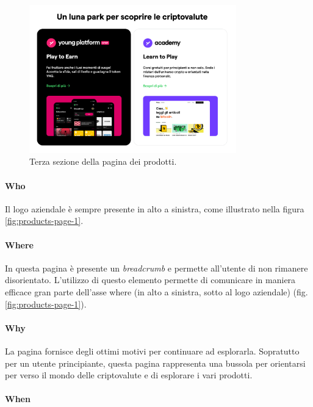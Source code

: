 \begin{figure}[H]
  \centering
  \includegraphics[width=0.80\textwidth]{res/images/internal-pages/products-page/products-page-3.png}
  \caption{Terza sezione della pagina dei prodotti.}
  \label{fig:products-page-3}
\end{figure}

\paragraph{Who}

Il logo aziendale è sempre presente in alto a sinistra, come illustrato 
nella figura \ref{fig:products-page-1}.

\paragraph{Where}

In questa pagina è presente un \textit{breadcrumb} e permette all'utente 
di non rimanere disorientato. L'utilizzo di questo elemento permette di 
comunicare in maniera efficace gran parte dell'asse where (in alto a 
sinistra, sotto al logo aziendale) (fig. \ref{fig:products-page-1}).

\paragraph{Why}

La pagina fornisce degli ottimi motivi per continuare ad esplorarla. 
Sopratutto per un utente principiante, questa pagina rappresenta una 
bussola per orientarsi per verso il mondo delle criptovalute e di 
esplorare i vari prodotti. 

\paragraph{When}

